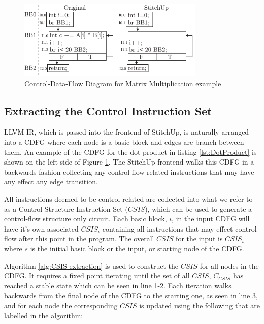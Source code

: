 \begin{figure}[t]
\centering
\includegraphics[width=3.5in]{./imgs/dot_product_cdfg.pdf}
\caption{Control-Data-Flow Diagram for Matrix Multiplication example}
\label{fig:mmm_cdfg}
\end{figure}

\subsection{Extracting the Control Instruction Set}
LLVM-IR, which is passed into the frontend of StitchUp, is naturally arranged into a CDFG
where each node is a basic block and edges are branch between them.
An example of the CDFG for the dot product in listing \ref{lst:DotProduct}
is shown on the left side of Figure \ref{fig:mmm_cdfg}.
The StitchUp frontend walks this CDFG in a backwards fashion collecting any control flow
related instructions that may have any effect any edge transition.

All instructions deemed to be control related are collected into what we refer to as a Control Structure Instruction Set ($CSIS$),
which can be used to generate a control-flow structure only circuit.
Each basic block, $i$, in the input CDFG will have it's own associated $CSIS_{i}$ containing all instructions that may effect
control-flow after this point in the program.
The overall $CSIS$ for the input is $CSIS_s$ where $s$ is the initial basic block or the input, or starting node of the CDFG.

Algorithm \ref{alg:CSIS-extraction} is used to construct the $CSIS$ for all nodes in the CDFG.
It requires a fixed point iterating until the set of all $CSIS$, $C_{CSIS}$ has reached a stable state
which can be seen in line 1-2.
Each iteration walks backwards from the final node of the CDFG to the starting one, as seen in
line 3, and for each node the corresponding $CSIS$ is updated using the following that are
labelled in the algorithm:

